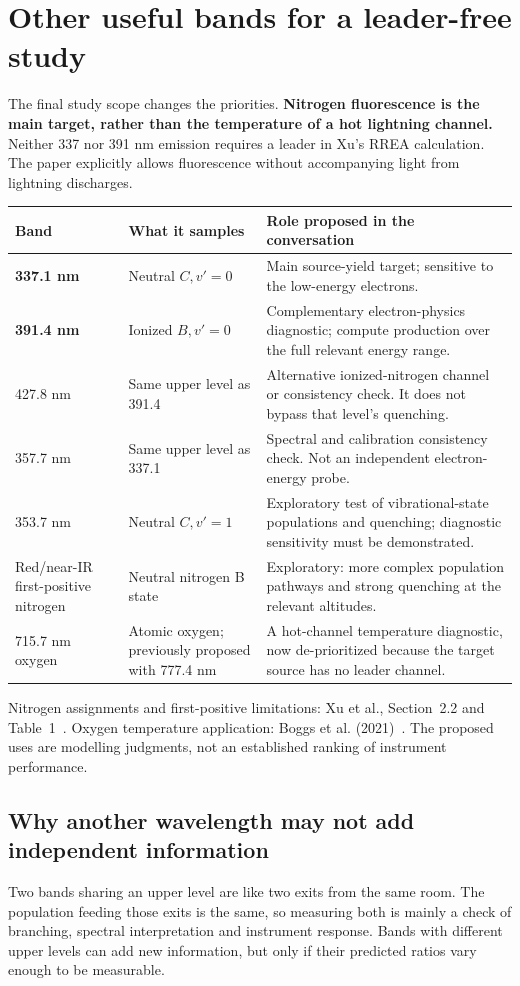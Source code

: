 \documentclass[11pt,a4paper]{article}
\newcommand{\xu}[1]{\cite[#1]{Xu2015}}
\newcommand{\source}[1]{{\small\color{muted}#1}\par}
\newcommand{\nextsection}[1]{\clearpage\section{#1}}
\begin{document}
\nextsection{Other useful bands for a leader-free study}
\label{sec:bands}
The final study scope changes the priorities. \textbf{Nitrogen fluorescence is the main target, rather than the temperature of a hot lightning channel.} Neither 337 nor 391 nm emission requires a leader in Xu's RREA calculation. The paper explicitly allows fluorescence without accompanying light from lightning discharges.\xu{Sec.~4.3}

\begin{center}
\small
\begin{tabularx}{\textwidth}{@{}P{22mm}P{38mm}Y@{}}
\toprule
\textbf{Band} & \textbf{What it samples} & \textbf{Role proposed in the conversation}\\
\midrule
\textbf{337.1 nm} & Neutral $C,v'=0$ & Main source-yield target; sensitive to the low-energy electrons.\\
\textbf{391.4 nm} & Ionized $B,v'=0$ & Complementary electron-physics diagnostic; compute production over the full relevant energy range.\\
427.8 nm & Same upper level as 391.4 & Alternative ionized-nitrogen channel or consistency check. It does not bypass that level's quenching.\\
357.7 nm & Same upper level as 337.1 & Spectral and calibration consistency check. Not an independent electron-energy probe.\\
353.7 nm & Neutral $C,v'=1$ & Exploratory test of vibrational-state populations and quenching; diagnostic sensitivity must be demonstrated.\\
Red/near-IR first-positive nitrogen & Neutral nitrogen B state & Exploratory: more complex population pathways and strong quenching at the relevant altitudes.\\
715.7 nm oxygen & Atomic oxygen; previously proposed with 777.4 nm & A hot-channel temperature diagnostic, now de-prioritized because the target source has no leader channel.\\
\bottomrule
\end{tabularx}
\end{center}
\source{Nitrogen assignments and first-positive limitations: Xu et al., Section~2.2 and Table~1~\cite{Xu2015}. Oxygen temperature application: Boggs et al. (2021)~\cite{Boggs2021}. The proposed uses are modelling judgments, not an established ranking of instrument performance.}

\subsection*{Why another wavelength may not add independent information}
Two bands sharing an upper level are like two exits from the same room. The population feeding those exits is the same, so measuring both is mainly a check of branching, spectral interpretation and instrument response. Bands with different upper levels can add new information, but only if their predicted ratios vary enough to be measurable.
\end{document}
